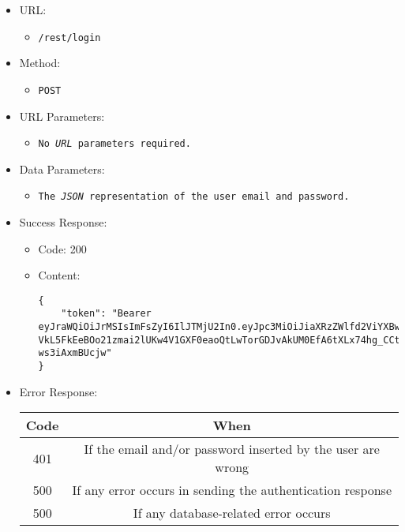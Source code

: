 \begin{itemize}

    \item URL:
    \begin{itemize}
        \item \texttt{/rest/login}
    \end{itemize}

    \item Method:
    \begin{itemize}
        \item \texttt{POST}
    \end{itemize}

    \item URL Parameters:
    \begin{itemize}
        \item \texttt{No \textit{URL} parameters required.}
    \end{itemize}

    \item Data Parameters:
    \begin{itemize}
        \item \texttt{The \textit{JSON} representation of the user email and password.}
    \end{itemize}

    \item Success Response:
    \begin{itemize}
        \item Code: 200
        \item Content:
        \begin{lstlisting}
{
    "token": "Bearer eyJraWQiOiJrMSIsImFsZyI6IlJTMjU2In0.eyJpc3MiOiJiaXRzZWlfd2ViYXBwIiwiYXVkIjoidXNlciIsImV4cCI6MTY4MjY4NDM1MywianRpIjoiVG1xYmMweWR6UjM3Y3BxNzVWRlFTQSIsImlhdCI6MTY4MjU5Nzk1MywibmJmIjoxNjgyNTk3ODMzLCJlbWFpbCI6Im1jaGF1ZHJldDBAZGFpbHltYWlsLmNvLnVrIiwib3duZXJfaWQiOjF9.FrVxA0wcw5nBcWmUl67RPA3lxMxcfij3Ri0ny8SJEIlNQNEdymF_fuTD2NQSWph3LwDvUnwe7gIfYkd69nZGmFuan-VkL5FkEeBOo21zmai2lUKw4V1GXF0eaoQtLwTorGDJvAkUM0EfA6tXLx74hg_CCtxpd6llu6SaaYM5vQNupIJ25PLDRPjmghLdiA5Q8aIIyr_2HrXEgq4b3WPsRaU8uZsNIEP2JoPeU5CYdsmkS_ADWBaIxnJ3k83pbTu83mh8eYCVTODhQLhrtUzZY15PlwzhWQBh8gU2AcyFIPdhEtQdlINN3n6o7twb6Zz_bntjGjUgy-ws3iAxmBUcjw"
}
        \end{lstlisting}
    \end{itemize}

    \item Error Response:
    \begin{table}[!h]
    \centering
    \begin{tabular}{|c|c|}
    \hline
    \multicolumn{1}{|c|}{\textbf{Code}} & \multicolumn{1}{c|}{\textbf{When}} \\ \hline
    401 & If the email and/or password inserted by the user are wrong \\\hline
    500 & If any error occurs in sending the authentication response \\\hline
    500 & If any database-related error occurs \\\hline
    \end{tabular}
    \end{table}

\end{itemize}



